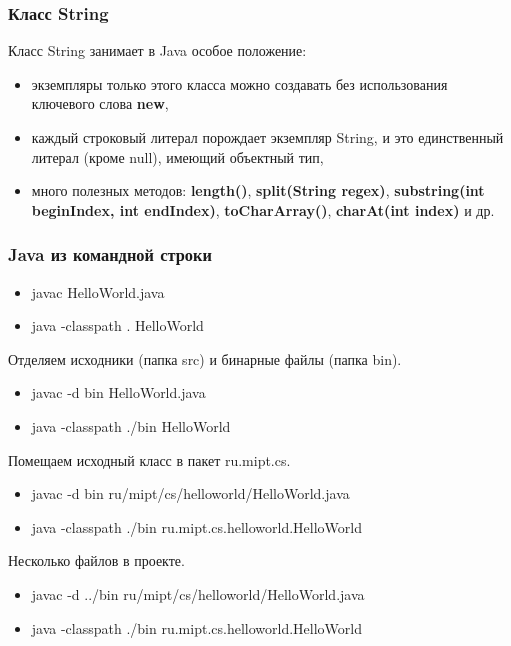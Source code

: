 \documentclass[default]{beamer}
\begin{document}

	\begin{frame}
		\frametitle{Класс String}
		
		Класс String занимает в Java особое положение:
		
		\begin{itemize}
			\item экземпляры только этого класса можно создавать без использования ключевого слова \textbf{new},
			\item каждый строковый литерал порождает экземпляр String, и это единственный литерал (кроме null), имеющий объектный тип,
			\item много полезных методов: \textbf{length()}, \textbf{split(String regex)}, \textbf{substring(int beginIndex, int endIndex)}, \textbf{toCharArray()}, \textbf{charAt(int index)} и др.
		\end{itemize}
		\lstString
	\end{frame}

	\begin{frame}
		\frametitle{Java из командной строки}
		
		\begin{itemize}
			\item javac HelloWorld.java
			\item java -classpath . HelloWorld
		\end{itemize}
		
		Отделяем исходники (папка src) и бинарные файлы (папка bin).
		\begin{itemize}
			\item javac -d bin HelloWorld.java
			\item java -classpath ./bin HelloWorld
		\end{itemize}
		
		Помещаем исходный класс в пакет ru.mipt.cs.
		\begin{itemize}
			\item javac -d bin ru/mipt/cs/helloworld/HelloWorld.java
			\item java -classpath ./bin ru.mipt.cs.helloworld.HelloWorld
		\end{itemize}				
		
		Несколько файлов в проекте.		
		\begin{itemize}
			\item javac -d ../bin ru/mipt/cs/helloworld/HelloWorld.java
			\item java -classpath ./bin ru.mipt.cs.helloworld.HelloWorld
		\end{itemize}				
	\end{frame}
\end{document}
